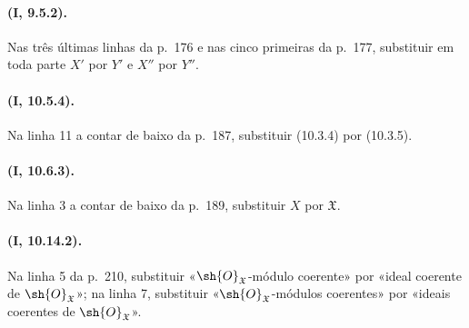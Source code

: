 \documentclass[oneside,10pt]{amsart}
\begin{document}
\paragraph{(I, 9.5.2).}
Nas três últimas linhas da p.~176 e nas cinco primeiras da p.~177,
substituir em toda parte $X'$ por $Y'$ e $X''$ por $Y''$.

\paragraph{(I, 10.5.4).}
Na linha 11 a contar de baixo da p.~187, substituir (10.3.4) por
(10.3.5).

\paragraph{(I, 10.6.3).}
Na linha 3 a contar de baixo da p.~189, substituir $X$ por
$\mathfrak X$.

\paragraph{(I, 10.14.2).}
Na linha 5 da p.~210, substituir «$\sh{O}_{\mathfrak X}$-módulo
coerente» por «ideal coerente de $\sh{O}_{\mathfrak X}$»; na linha 7,
substituir «$\sh{O}_{\mathfrak X}$-módulos coerentes» por «ideais
coerentes de $\sh{O}_{\mathfrak X}$».
\end{document}
